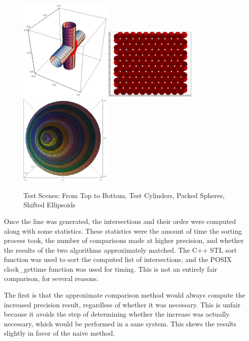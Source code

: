 \documentclass{cccg16}
\begin{document}
\begin{figure}
  \includegraphics[width=0.4\textwidth]{imgs/cylinder_model_planeless.png}
  \includegraphics[width=0.4\textwidth]{imgs/packedSpheres.png}
  \includegraphics[width=0.4\textwidth]{imgs/hardEllipsoidsSingle.png}
  \caption{Test Scenes: From Top to Bottom, Test Cylinders, Packed
    Spheres, Shifted Ellipsoids}
  \label{fig:testScenes}
\end{figure}

Once the line was generated, the intersections and their order were
computed along with some statistics.  These statistics were the amount
of time the sorting process took, the number of comparisons made at
higher precision, and whether the results of the two algorithms
approximately matched.  The C++ STL sort function was used to sort the
computed list of intersections, and the POSIX clock\_gettime function
was used for timing.  This is not an entirely fair comparison, for
several reasons.

The first is that the approximate comparison method would always
compute the increased precision result, regardless of whether it was
necessary.  This is unfair because it avoids the step of determining
whether the increase was actually necessary, which would be performed
in a sane system.  This skews the results slightly in favor of the naive
method.
\end{document}
